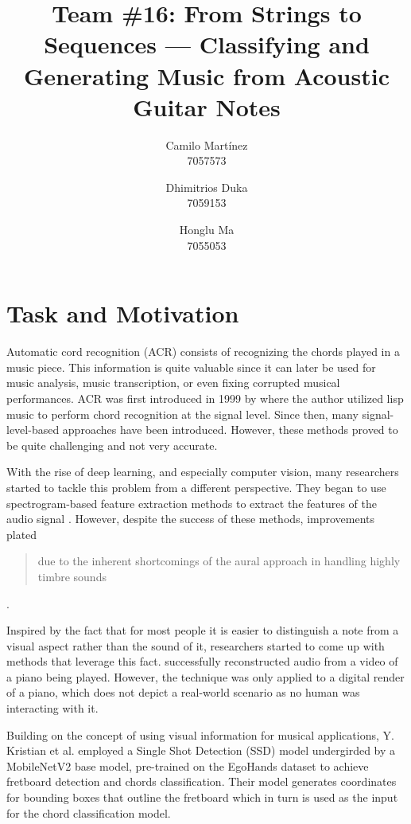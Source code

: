 \documentclass[10pt,twocolumn,letterpaper]{article}
\begin{document}
\title{Team \#16: From Strings to Sequences --- Classifying and Generating Music from Acoustic Guitar Notes}

\author{
Camilo Martínez\\
7057573\\
\and
Dhimitrios Duka\\
7059153\\
\and
Honglu Ma\\
7055053\\
}
\maketitle

\section{Task and Motivation}
Automatic cord recognition (ACR) consists of recognizing the chords played in a music piece. This information is quite valuable since it can later be used for music analysis, music transcription, or even fixing corrupted musical performances. ACR was first introduced in 1999 by \cite{takuya1999realtime} where the author utilized lisp music to perform chord recognition at the signal level. Since then, many signal-level-based approaches have been introduced. However, these methods proved to be quite challenging and not very accurate. 

With the rise of deep learning, and especially computer vision, many researchers started to tackle this problem from a different perspective. They began to use spectrogram-based feature extraction methods to extract the features of the audio signal \cite{boulanger2013audio, korzeniowski2016feature, stark2009real}. However, despite the success of these methods, improvements plated \blockquote{due to the inherent shortcomings of the aural approach in handling highly timbre sounds} \cite{du2023conditional}. 

Inspired by the fact that for most people it is easier to distinguish a note from a visual aspect rather than the sound of it, researchers started to come up with methods that leverage this fact. \cite{su2020audeo} successfully reconstructed audio from a video of a piano being played. However, the technique was only applied to a digital render of a piano, which does not depict a real-world scenario as no human was interacting with it.

Building on the concept of using visual information for musical applications, Y. Kristian et al. \cite{Kristian_Zaman_Tenoyo_Jodhinata_2024} employed a Single Shot Detection (SSD) model undergirded by a MobileNetV2 base model, pre-trained on the EgoHands dataset to achieve fretboard detection and chords classification. Their model generates coordinates for bounding boxes that outline the fretboard which in turn is used as the input for the chord classification model.
\end{document}
